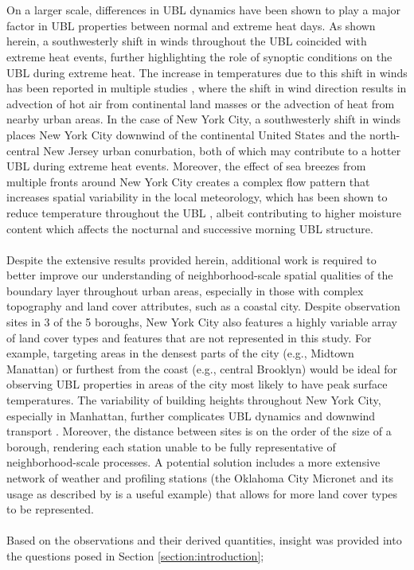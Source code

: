 \documentclass[11pt,a4paper]{article}
\begin{document}
\\ \\
On a larger scale, differences in UBL dynamics have been shown to play a major factor in UBL properties between normal and extreme heat days. As shown herein, a southwesterly shift in winds throughout the UBL coincided with extreme heat events, further highlighting the role of synoptic conditions on the UBL during extreme heat. The increase in temperatures due to this shift in winds has been reported in multiple studies \citep{heaviside2015, jiang2019, ramamurthy2017b}, where the shift in wind direction results in advection of hot air from continental land masses or the advection of heat from nearby urban areas. In the case of New York City, a southwesterly shift in winds places New York City downwind of the continental United States and the north-central New Jersey urban conurbation, both of which may contribute to a hotter UBL during extreme heat events. Moreover, the effect of sea breezes from multiple fronts around New York City creates a complex flow pattern that increases spatial variability in the local meteorology, which has been shown to reduce temperature throughout the UBL \citep{han2022, hirsch2021, lee2021}, albeit contributing to higher moisture content which affects the nocturnal and successive morning UBL structure.
\\ \\
Despite the extensive results provided herein, additional work is required to better improve our understanding of neighborhood-scale spatial qualities of the boundary layer throughout urban areas, especially in those with complex topography and land cover attributes, such as a coastal city. Despite observation sites in 3 of the 5 boroughs, New York City also features a highly variable array of land cover types and features that are not represented in this study. For example, targeting areas in the densest parts of the city (e.g., Midtown Manattan) or furthest from the coast (e.g., central Brooklyn) would be ideal for observing UBL properties in areas of the city most likely to have peak surface temperatures. The variability of building heights throughout New York City, especially in Manhattan, further complicates UBL dynamics and downwind transport \citep{hanna2006, hanna2007}. Moreover, the distance between sites is on the order of the size of a borough, rendering each station unable to be fully representative of neighborhood-scale processes. A potential solution includes a more extensive network of weather and profiling stations (the Oklahoma City Micronet and its usage as described by \citet{basara2010} is a useful example) that allows for more land cover types to be represented.
\\ \\
Based on the observations and their derived quantities, insight was provided into the questions posed in Section \ref{section:introduction};
\end{document}
